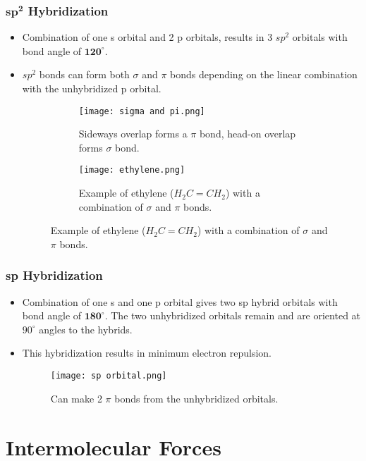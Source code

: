 \documentclass[12pt, letterpaper, twoside]{article}
\begin{document}
\subsubsection{$\mathbf{sp^2}$ Hybridization}
\begin{itemize}
    \item Combination of one s orbital and 2 p orbitals, results in 3 $sp^2$ orbitals with bond angle of $\mathbf{120^{\circ}}$.
    \item $sp^2$ bonds can form both $\sigma$ and $\pi$ bonds depending on the linear combination with the unhybridized p orbital.
    \begin{figure}[!ht]
        \centering
        \begin{subfigure}{0.48\textwidth}
            \centering
            \texttt{[image: sigma and pi.png]}
            \caption{Sideways overlap forms a $\pi$ bond, head-on overlap forms  $\sigma$ bond.}
            \label{fig:p1p2}
        \end{subfigure}%
        \hspace{0.2cm}
        \begin{subfigure}{0.48\textwidth}
            \centering
            \texttt{[image: ethylene.png]}
            \caption{Example of ethylene ($H_2C = CH_2$) with a combination of $\sigma$ and $\pi$ bonds.}
            \label{fig:p1p2 2}
        \end{subfigure}    
    \end{figure}
\end{itemize}
\subsubsection{sp Hybridization}

\begin{itemize}
    \item Combination of one s and one p orbital gives two sp hybrid orbitals with bond angle of $\mathbf{180^{\circ}}$. The two unhybridized orbitals remain and are oriented at $90^{\circ}$ angles to the hybrids.
    \item This hybridization results in minimum electron repulsion.
    \begin{figure}[!ht]
        \centering
        \texttt{[image: sp orbital.png]}
        \caption{Can make 2 $\pi$ bonds from the unhybridized orbitals.}
    \end{figure}
\end{itemize}

\section{Intermolecular Forces}
\end{document}
